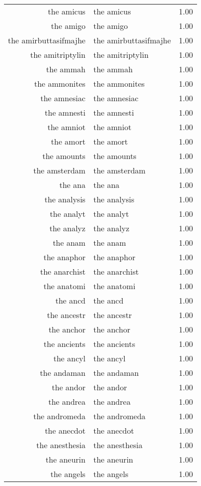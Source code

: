\begin{table}[ht]
\begin{tabular}{rlr}
  the amicus & the amicus & 1.00 \\ 
  the amigo & the amigo & 1.00 \\ 
  the amirbuttasifmajhe & the amirbuttasifmajhe & 1.00 \\ 
  the amitriptylin & the amitriptylin & 1.00 \\ 
  the ammah & the ammah & 1.00 \\ 
  the ammonites & the ammonites & 1.00 \\ 
  the amnesiac & the amnesiac & 1.00 \\ 
  the amnesti & the amnesti & 1.00 \\ 
  the amniot & the amniot & 1.00 \\ 
  the amort & the amort & 1.00 \\ 
  the amounts & the amounts & 1.00 \\ 
  the amsterdam & the amsterdam & 1.00 \\ 
  the ana & the ana & 1.00 \\ 
  the analysis & the analysis & 1.00 \\ 
  the analyt & the analyt & 1.00 \\ 
  the analyz & the analyz & 1.00 \\ 
  the anam & the anam & 1.00 \\ 
  the anaphor & the anaphor & 1.00 \\ 
  the anarchist & the anarchist & 1.00 \\ 
  the anatomi & the anatomi & 1.00 \\ 
  the ancd & the ancd & 1.00 \\ 
  the ancestr & the ancestr & 1.00 \\ 
  the anchor & the anchor & 1.00 \\ 
  the ancients & the ancients & 1.00 \\ 
  the ancyl & the ancyl & 1.00 \\ 
  the andaman & the andaman & 1.00 \\ 
  the andor & the andor & 1.00 \\ 
  the andrea & the andrea & 1.00 \\ 
  the andromeda & the andromeda & 1.00 \\ 
  the anecdot & the anecdot & 1.00 \\ 
  the anesthesia & the anesthesia & 1.00 \\ 
  the aneurin & the aneurin & 1.00 \\ 
  the angels & the angels & 1.00 \\ 

\end{tabular}
\end{table}
